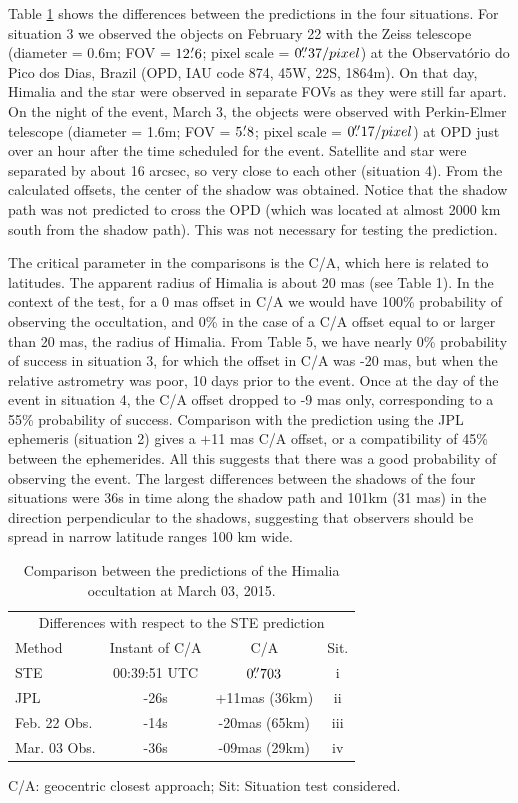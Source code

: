 \documentclass[useAMS,usenatbib]{mn2e}
\begin{document}
Table \ref{Tab: comparison-Himalia} shows the differences between the predictions in the four situations. For situation 3 we observed the objects on February 22 with the Zeiss telescope (diameter = 0.6m; FOV = $12\hbox{$.\mkern-4mu^\prime$}6$; pixel scale = $0\hbox{$.\!\!^{\prime\prime}$}37 / pixel$) at the Observatório do Pico dos Dias, Brazil (OPD, IAU code 874, 45\arcsec W, 22\arcsec S, 1864m). On that day, Himalia and the star were observed in separate FOVs as they were still far apart. On the night of the event, March 3, the objects were observed with Perkin-Elmer telescope (diameter = 1.6m; FOV = $5\hbox{$.\mkern-4mu^\prime$}8$; pixel scale = $0\hbox{$.\!\!^{\prime\prime}$}17 / pixel$) at OPD just over an hour after the time scheduled for the event. Satellite and star were separated by about 16 arcsec, so very close to each other (situation 4). From the calculated offsets, the center of the shadow was obtained. Notice that the shadow path was not predicted to cross the OPD (which was located at almost 2000 km south from the shadow path). This was not necessary for testing the prediction.

The critical parameter in the comparisons is the C/A, which here is related to latitudes. The apparent radius of Himalia is about 20 mas (see Table 1). In the context of the test, for a 0 mas offset in C/A we would have 100\% probability of observing the occultation, and 0\% in the case of a C/A offset equal to or larger than 20 mas, the radius of Himalia. From Table 5, we have nearly 0\% probability of success in situation 3, for which the offset in C/A was -20 mas, but when the relative astrometry was poor, 10 days prior to the event. Once at the day of the event in situation 4, the C/A offset dropped to -9 mas only, corresponding to a 55\% probability of success. Comparison with the prediction using the JPL ephemeris (situation 2) gives a +11 mas C/A offset, or a compatibility of 45\% between the ephemerides. All this suggests that there was a good probability of observing the event. The largest differences between the shadows of the four situations were 36s in time along the shadow path and 101km (31 mas) in the direction perpendicular to the shadows, suggesting that observers should be spread in narrow latitude ranges 100 km wide.

\begin{table}
\caption{\label{Tab: comparison-Himalia} Comparison between the predictions of the Himalia occultation at March 03, 2015.}
\begin{centering}
\begin{tabular}{lccc}
\hline  \hline
\multicolumn{4}{c}{Differences with respect to the STE prediction} \tabularnewline
Method  & Instant of C/A  & C/A & Sit.   \tabularnewline
\hline
STE & 00:39:51 UTC & $0\hbox{$.\!\!^{\prime\prime}$}703$ & i \tabularnewline
JPL & -26s & +11mas (36km) & ii \tabularnewline %
Feb. 22 Obs. & -14s & -20mas (65km) & iii \tabularnewline %
Mar. 03 Obs. & -36s & -09mas (29km) & iv \tabularnewline %
\hline
\end{tabular}
\par\end{centering}
C/A: geocentric closest approach; Sit: Situation test considered.
\end{table}
\end{document}
